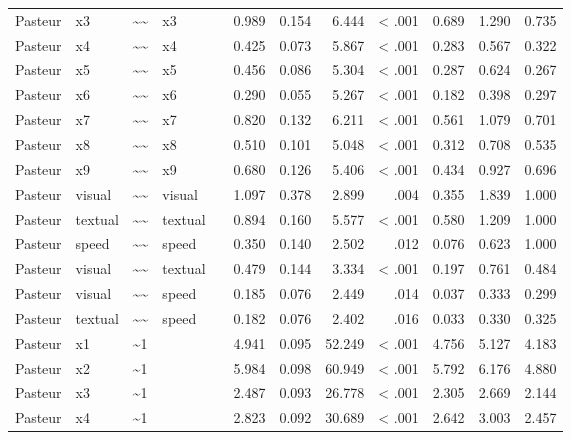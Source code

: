 \documentclass[11pt]{article}
\begin{document}
\begin{landscape}
\begin{longtable}{llllrrrrrrrr}
Pasteur & x3 & \textasciitilde{}\textasciitilde{} & x3 &  & 0.989 & 0.154 & 6.444 & < .001 & 0.689 & 1.290 & 0.735 \\
Pasteur & x4 & \textasciitilde{}\textasciitilde{} & x4 &  & 0.425 & 0.073 & 5.867 & < .001 & 0.283 & 0.567 & 0.322 \\
Pasteur & x5 & \textasciitilde{}\textasciitilde{} & x5 &  & 0.456 & 0.086 & 5.304 & < .001 & 0.287 & 0.624 & 0.267 \\
Pasteur & x6 & \textasciitilde{}\textasciitilde{} & x6 &  & 0.290 & 0.055 & 5.267 & < .001 & 0.182 & 0.398 & 0.297 \\
Pasteur & x7 & \textasciitilde{}\textasciitilde{} & x7 &  & 0.820 & 0.132 & 6.211 & < .001 & 0.561 & 1.079 & 0.701 \\
Pasteur & x8 & \textasciitilde{}\textasciitilde{} & x8 &  & 0.510 & 0.101 & 5.048 & < .001 & 0.312 & 0.708 & 0.535 \\
Pasteur & x9 & \textasciitilde{}\textasciitilde{} & x9 &  & 0.680 & 0.126 & 5.406 & < .001 & 0.434 & 0.927 & 0.696 \\
Pasteur & visual & \textasciitilde{}\textasciitilde{} & visual &  & 1.097 & 0.378 & 2.899 & .004 & 0.355 & 1.839 & 1.000 \\
Pasteur & textual & \textasciitilde{}\textasciitilde{} & textual &  & 0.894 & 0.160 & 5.577 & < .001 & 0.580 & 1.209 & 1.000 \\
Pasteur & speed & \textasciitilde{}\textasciitilde{} & speed &  & 0.350 & 0.140 & 2.502 & .012 & 0.076 & 0.623 & 1.000 \\
Pasteur & visual & \textasciitilde{}\textasciitilde{} & textual &  & 0.479 & 0.144 & 3.334 & < .001 & 0.197 & 0.761 & 0.484 \\
Pasteur & visual & \textasciitilde{}\textasciitilde{} & speed &  & 0.185 & 0.076 & 2.449 & .014 & 0.037 & 0.333 & 0.299 \\
Pasteur & textual & \textasciitilde{}\textasciitilde{} & speed &  & 0.182 & 0.076 & 2.402 & .016 & 0.033 & 0.330 & 0.325 \\
Pasteur & x1 & \textasciitilde{}1 &  &  & 4.941 & 0.095 & 52.249 & < .001 & 4.756 & 5.127 & 4.183 \\
Pasteur & x2 & \textasciitilde{}1 &  &  & 5.984 & 0.098 & 60.949 & < .001 & 5.792 & 6.176 & 4.880 \\
Pasteur & x3 & \textasciitilde{}1 &  &  & 2.487 & 0.093 & 26.778 & < .001 & 2.305 & 2.669 & 2.144 \\
Pasteur & x4 & \textasciitilde{}1 &  &  & 2.823 & 0.092 & 30.689 & < .001 & 2.642 & 3.003 & 2.457 \\

\end{longtable}
\end{landscape}
\end{document}
